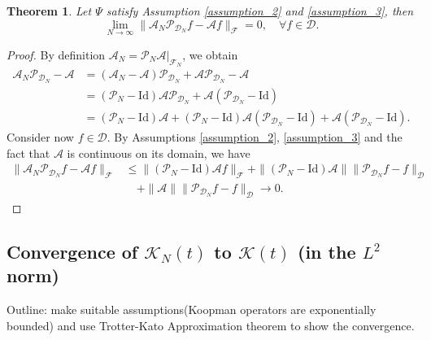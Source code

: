 \documentclass{article}[11]
\newtheorem{theorem}{Theorem}
\begin{document}
\begin{theorem}
	Let $\Psi$ satisfy Assumption \ref{assumption_2} and \ref{assumption_3}, then
	\[
	\lim_{N \to \infty} \| \mathcal{A}_N \mathcal{P}_{\mathcal{D}_N} f - \mathcal{A} f \|_{\mathcal{F}} = 0, \quad \forall f \in \mathcal{D}.
	\]
\end{theorem}

\begin{proof}
	By definition $\mathcal{A}_N = \mathcal{P}_N \mathcal{A} |_{\mathcal{F}_N}$, we obtain
	\begin{align*}
		\mathcal{A}_N \mathcal{P}_{\mathcal{D}_N} - \mathcal{A} &= (\mathcal{A}_N - \mathcal{A}) \mathcal{P}_{\mathcal{D}_N} + \mathcal{A} \mathcal{P}_{\mathcal{D}_N} - \mathcal{A} \\
		&= (\mathcal{P}_N - \mathrm{Id}) \mathcal{A} \mathcal{P}_{\mathcal{D}_N} + \mathcal{A} (\mathcal{P}_{\mathcal{D}_N} - \mathrm{Id}) \\
		&= (\mathcal{P}_N - \mathrm{Id}) \mathcal{A} + (\mathcal{P}_N - \mathrm{Id}) \mathcal{A} (\mathcal{P}_{\mathcal{D}_N} - \mathrm{Id}) + \mathcal{A} (\mathcal{P}_{\mathcal{D}_N} - \mathrm{Id}).
	\end{align*}	
	Consider now $f \in \mathcal{D}$. By Assumptions \ref{assumption_2}, \ref{assumption_3} and the fact that $\mathcal{A}$ is continuous on its domain, we have
	\begin{align*}
		\| \mathcal{A}_N \mathcal{P}_{\mathcal{D}_N} f - \mathcal{A} f \|_{\mathcal{F}} &\leq \| (\mathcal{P}_N - \mathrm{Id}) \mathcal{A} f \|_{\mathcal{F}} + \| (\mathcal{P}_N - \mathrm{Id}) \mathcal{A} \| \| \mathcal{P}_{\mathcal{D}_N} f - f \|_{\mathcal{D}} \\
		&\quad + \| \mathcal{A} \| \| \mathcal{P}_{\mathcal{D}_N} f - f \|_{\mathcal{D}} \to 0.
	\end{align*}
	
	
	
	
\end{proof}




\subsection{Convergence of \(\mathcal{K}_N(t)\) to \(\mathcal{K}(t)\) (in the \(L^2\) norm)}

Outline: make suitable assumptions(Koopman operators are exponentially bounded) and use Trotter-Kato Approximation theorem to show the convergence.
\end{document}
